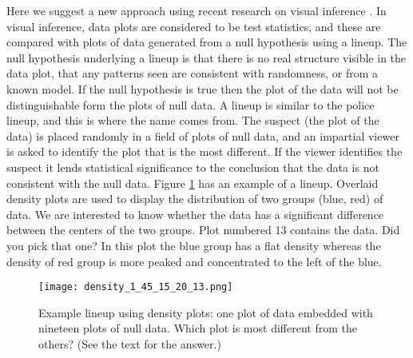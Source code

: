 

Here we suggest a new approach using recent research on visual inference \cite{buja:2009,wickham:2010}. In visual inference, data plots are considered to be test statistics, and these are compared with plots of data generated from a null hypothesis using a lineup. The null hypothesis underlying a lineup is that there is no real structure visible in the data plot, that any patterns seen are consistent with randomness, or from a known model. If the null hypothesis is true then the plot of the data will not be distinguishable form the plots of null data. A lineup is similar to the police lineup, and this is where the name comes from. The suspect (the plot of the data) is placed randomly in a field of plots of null data, and an impartial viewer is asked to identify the plot that is the most different. If the viewer identifies the suspect it lends statistical significance to the conclusion that the data is not consistent with the null data. Figure \ref{lineup} has an example of a lineup. Overlaid density plots are used to display the distribution of two groups (blue, red) of data. We are interested to know whether the data has a significant difference between the centers of the two groups. Plot numbered 13 contains the data. Did you pick that one? In this plot the blue group has a flat density whereas the density of red group is more peaked and concentrated to the left of the blue.

\begin{figure}[htbp]
   \centering
   \texttt{[image: density\_1\_45\_15\_20\_13.png]} 
   \caption{Example lineup using density plots: one plot of data
     embedded with nineteen plots of null data. Which plot is
     most different from the others? (See the text for the answer.)}
   \label{lineup}
\end{figure}

